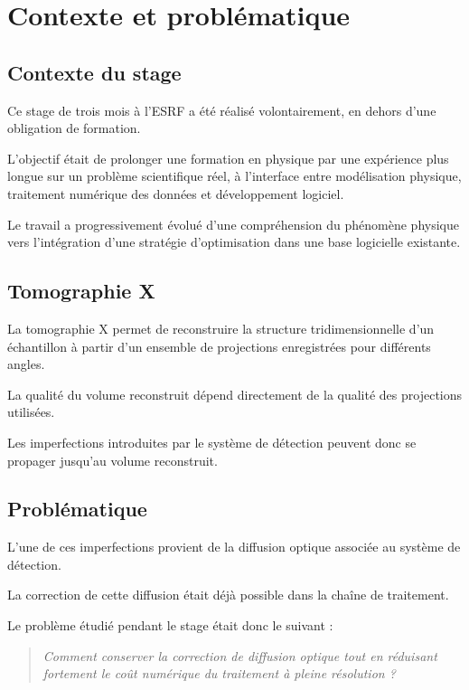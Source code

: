\documentclass[11pt,a4paper]{report}
\begin{document}
\chapter{Contexte et problématique}

\section{Contexte du stage}

Ce stage de trois mois à l'ESRF a été réalisé volontairement, en dehors
d'une obligation de formation.

L'objectif était de prolonger une formation en physique par une expérience
plus longue sur un problème scientifique réel, à l'interface entre
modélisation physique, traitement numérique des données et développement
logiciel.

Le travail a progressivement évolué d'une compréhension du phénomène
physique vers l'intégration d'une stratégie d'optimisation dans une base
logicielle existante.

\section{Tomographie X}

La tomographie X permet de reconstruire la structure tridimensionnelle
d'un échantillon à partir d'un ensemble de projections enregistrées pour
différents angles.

La qualité du volume reconstruit dépend directement de la qualité des
projections utilisées.

Les imperfections introduites par le système de détection peuvent donc se
propager jusqu'au volume reconstruit.

\section{Problématique}

L'une de ces imperfections provient de la diffusion optique associée au
système de détection.

La correction de cette diffusion était déjà possible dans la chaîne de
traitement.

Le problème étudié pendant le stage était donc le suivant :

\begin{quote}
\centering
\textit{Comment conserver la correction de diffusion optique tout en
réduisant fortement le coût numérique du traitement à pleine résolution ?}
\end{quote}
\end{document}
